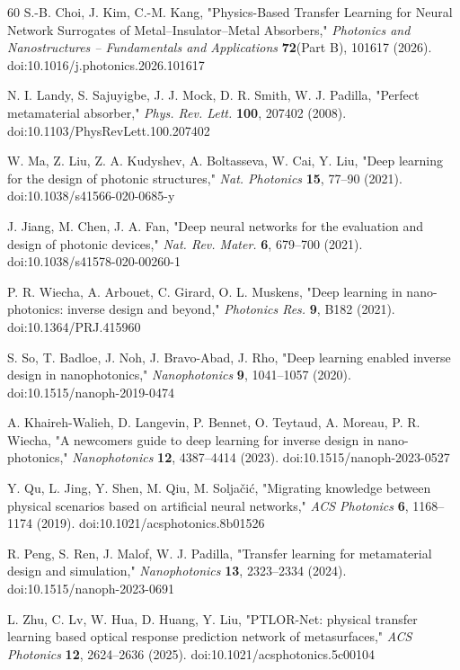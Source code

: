 \documentclass[11pt,a4paper]{article}
\begin{document}
\begin{thebibliography}{60}
S.-B. Choi, J. Kim, C.-M. Kang, "Physics-Based Transfer Learning for Neural Network Surrogates of Metal--Insulator--Metal Absorbers," \emph{Photonics and Nanostructures -- Fundamentals and Applications} \textbf{72}(Part B), 101617 (2026). doi:10.1016/j.photonics.2026.101617

N. I. Landy, S. Sajuyigbe, J. J. Mock, D. R. Smith, W. J. Padilla, "Perfect metamaterial absorber," \emph{Phys. Rev. Lett.} \textbf{100}, 207402 (2008). doi:10.1103/PhysRevLett.100.207402

W. Ma, Z. Liu, Z. A. Kudyshev, A. Boltasseva, W. Cai, Y. Liu, "Deep learning for the design of photonic structures," \emph{Nat. Photonics} \textbf{15}, 77--90 (2021). doi:10.1038/s41566-020-0685-y

J. Jiang, M. Chen, J. A. Fan, "Deep neural networks for the evaluation and design of photonic devices," \emph{Nat. Rev. Mater.} \textbf{6}, 679--700 (2021). doi:10.1038/s41578-020-00260-1

P. R. Wiecha, A. Arbouet, C. Girard, O. L. Muskens, "Deep learning in nano-photonics: inverse design and beyond," \emph{Photonics Res.} \textbf{9}, B182 (2021). doi:10.1364/PRJ.415960

S. So, T. Badloe, J. Noh, J. Bravo-Abad, J. Rho, "Deep learning enabled inverse design in nanophotonics," \emph{Nanophotonics} \textbf{9}, 1041--1057 (2020). doi:10.1515/nanoph-2019-0474

A. Khaireh-Walieh, D. Langevin, P. Bennet, O. Teytaud, A. Moreau, P. R. Wiecha, "A newcomer\textquotesingle s guide to deep learning for inverse design in nano-photonics," \emph{Nanophotonics} \textbf{12}, 4387--4414 (2023). doi:10.1515/nanoph-2023-0527

Y. Qu, L. Jing, Y. Shen, M. Qiu, M. Solja\v{c}i\'c, "Migrating knowledge between physical scenarios based on artificial neural networks," \emph{ACS Photonics} \textbf{6}, 1168--1174 (2019). doi:10.1021/acsphotonics.8b01526

R. Peng, S. Ren, J. Malof, W. J. Padilla, "Transfer learning for metamaterial design and simulation," \emph{Nanophotonics} \textbf{13}, 2323--2334 (2024). doi:10.1515/nanoph-2023-0691

L. Zhu, C. Lv, W. Hua, D. Huang, Y. Liu, "PTLOR-Net: physical transfer learning based optical response prediction network of metasurfaces," \emph{ACS Photonics} \textbf{12}, 2624--2636 (2025). doi:10.1021/acsphotonics.5c00104


\end{thebibliography}
\end{document}
